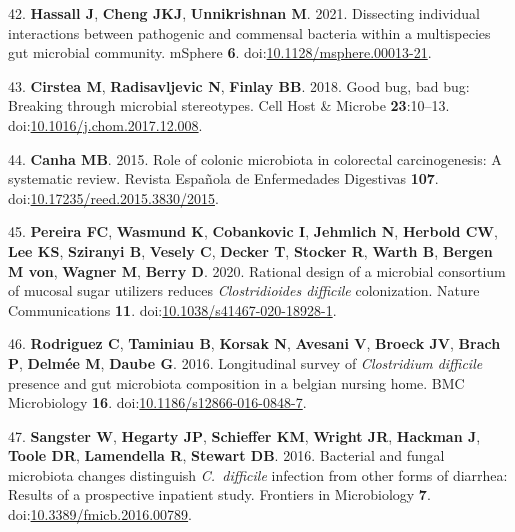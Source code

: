 \documentclass[
  11pt,
]{article}
\begin{document}
\leavevmode\hypertarget{ref-Hassall2021}{}%
42. \textbf{Hassall J}, \textbf{Cheng JKJ}, \textbf{Unnikrishnan M}.
2021. Dissecting individual interactions between pathogenic and
commensal bacteria within a multispecies gut microbial community.
mSphere \textbf{6}.
doi:\href{https://doi.org/10.1128/msphere.00013-21}{10.1128/msphere.00013-21}.

\leavevmode\hypertarget{ref-Cirstea2018}{}%
43. \textbf{Cirstea M}, \textbf{Radisavljevic N}, \textbf{Finlay BB}.
2018. Good bug, bad bug: Breaking through microbial stereotypes. Cell
Host \& Microbe \textbf{23}:10--13.
doi:\href{https://doi.org/10.1016/j.chom.2017.12.008}{10.1016/j.chom.2017.12.008}.

\leavevmode\hypertarget{ref-BorgesCanha2015}{}%
44. \textbf{Canha MB}. 2015. Role of colonic microbiota in colorectal
carcinogenesis: A systematic review. Revista Española de Enfermedades
Digestivas \textbf{107}.
doi:\href{https://doi.org/10.17235/reed.2015.3830/2015}{10.17235/reed.2015.3830/2015}.

\leavevmode\hypertarget{ref-Pereira2020}{}%
45. \textbf{Pereira FC}, \textbf{Wasmund K}, \textbf{Cobankovic I},
\textbf{Jehmlich N}, \textbf{Herbold CW}, \textbf{Lee KS},
\textbf{Sziranyi B}, \textbf{Vesely C}, \textbf{Decker T},
\textbf{Stocker R}, \textbf{Warth B}, \textbf{Bergen M von},
\textbf{Wagner M}, \textbf{Berry D}. 2020. Rational design of a
microbial consortium of mucosal sugar utilizers reduces
\emph{Clostridioides difficile} colonization. Nature Communications
\textbf{11}.
doi:\href{https://doi.org/10.1038/s41467-020-18928-1}{10.1038/s41467-020-18928-1}.

\leavevmode\hypertarget{ref-Rodriguez2016}{}%
46. \textbf{Rodriguez C}, \textbf{Taminiau B}, \textbf{Korsak N},
\textbf{Avesani V}, \textbf{Broeck JV}, \textbf{Brach P}, \textbf{Delmée
M}, \textbf{Daube G}. 2016. Longitudinal survey of \emph{Clostridium
difficile} presence and gut microbiota composition in a belgian nursing
home. BMC Microbiology \textbf{16}.
doi:\href{https://doi.org/10.1186/s12866-016-0848-7}{10.1186/s12866-016-0848-7}.

\leavevmode\hypertarget{ref-Sangster2016}{}%
47. \textbf{Sangster W}, \textbf{Hegarty JP}, \textbf{Schieffer KM},
\textbf{Wright JR}, \textbf{Hackman J}, \textbf{Toole DR},
\textbf{Lamendella R}, \textbf{Stewart DB}. 2016. Bacterial and fungal
microbiota changes distinguish \emph{C.~difficile} infection from other
forms of diarrhea: Results of a prospective inpatient study. Frontiers
in Microbiology \textbf{7}.
doi:\href{https://doi.org/10.3389/fmicb.2016.00789}{10.3389/fmicb.2016.00789}.
\end{document}
